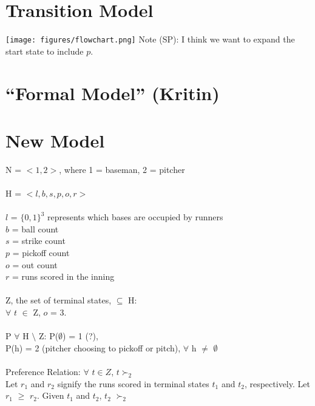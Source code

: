 \documentclass{article}
\begin{document}
  \section{Transition Model}

  \texttt{[image: figures/flowchart.png]}
  Note (SP): I think we want to expand the start state to include $p$.

\section{``Formal Model'' (Kritin)}
\section{New Model}
N = $<1,2>$, where 1 = baseman, 2 = pitcher \\\\
H = $<l, b, s, p, o, r>$ \\ \\
$l$ = $\{0, 1\}^3$ represents which bases are occupied by runners\\
$b$ = ball count \\
$s$ = strike count \\
$p$ = pickoff count \\
$o$ = out count \\
$r$ = runs scored in the inning \\\\
Z, the set of terminal states, $\subseteq$ H: \\
$\forall$ $t$ $\in$ Z, $o$ = 3. \\\\
P $\forall$ H $\setminus$ Z: P($\emptyset$) = 1 (?),\\P(h) = 2 (pitcher choosing to pickoff or pitch), $\forall$ h $\neq$ $\emptyset$\\\\
Preference Relation: 
$\forall$ $t \in Z$, $t \succ_2$ \\
Let $r_1$ and $r_2$ signify the runs scored in terminal states $t_1$ and $t_2$, respectively. Let $r_1$ $\geq$ $r_2$. Given $t_1$ and $t_2$, $t_2$ $\succ_2$ 
\end{document}
